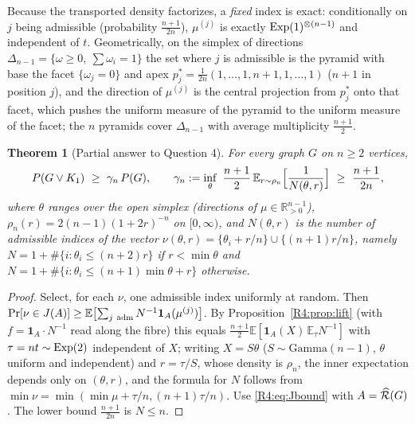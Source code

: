 \documentclass[11pt]{amsart}
\newtheorem{theorem}{Theorem}[section]
\theoremstyle{definition}
\theoremstyle{remark}
\providecommand{\R}{\mathbb R}
\begin{document}
Because the transported density factorizes, a \emph{fixed} index is
exact: conditionally on $j$ being admissible (probability
$\frac{n+1}{2n}$), $\mu^{(j)}$ is exactly $\operatorname{Exp}(1)^{\otimes(n-1)}$ and
independent of $t$.  Geometrically, on the simplex of directions
$\Delta_{n-1}=\{\omega\ge0,\ \sum\omega_i=1\}$ the set where $j$ is admissible
is the pyramid with base the facet $\{\omega_j=0\}$ and apex
$p_j^*=\frac1{2n}(1,\dots,1,n+1,1,\dots,1)$ ($n+1$ in position $j$), and the
direction of $\mu^{(j)}$ is the central projection from $p_j^*$ onto that
facet, which pushes the uniform measure of the pyramid to the uniform
measure of the facet; the $n$ pyramids cover $\Delta_{n-1}$ with average
multiplicity $\frac{n+1}2$.

\begin{theorem}[Partial answer to Question 4]\label{R4:thm:Q4partial}
For every graph $G$ on $n\ge2$ vertices,
\[
 P(G\vee K_1)\ \ge\ \gamma_n\,P(G),\qquad
 \gamma_n:=\inf_{\theta}\ \frac{n+1}{2}\,
 \mathbb E_{r\sim\rho_n}\Bigl[\frac1{N(\theta,r)}\Bigr]\ \ge\ \frac{n+1}{2n},
\]
where $\theta$ ranges over the open simplex (directions of
$\mu\in\R^{n-1}_{>0}$), $\rho_n(r)=2(n-1)(1+2r)^{-n}$ on $[0,\infty)$, and
$N(\theta,r)$ is the number of admissible indices of the vector
$\nu(\theta,r)=\{\theta_i+r/n\}\cup\{(n+1)r/n\}$, namely
$N=1+\#\{i:\theta_i\le(n+2)r\}$ if $r<\min\theta$ and
$N=1+\#\{i:\theta_i\le(n+1)\min\theta+r\}$ otherwise.
\end{theorem}

\begin{proof}
Select, for each $\nu$, one admissible index uniformly at random.  Then
$\Pr[\nu\in J(A)]\ge\mathbb E\bigl[\sum_{j\ \rm adm}N^{-1}\mathbf
1_A(\mu^{(j)})\bigr]$.  By Proposition~\ref{R4:prop:lift} (with
$f=\mathbf 1_A\cdot N^{-1}$ read along the fibre) this equals
$\frac{n+1}{2}\mathbb E[\mathbf 1_A(X)\,\mathbb E_\tau N^{-1}]$ with
$\tau=nt\sim\operatorname{Exp}(2)$ independent of $X$; writing $X=S\theta$
($S\sim\mathrm{Gamma}(n-1)$, $\theta$ uniform and independent) and
$r=\tau/S$, whose density is $\rho_n$, the inner expectation depends only
on $(\theta,r)$, and the formula for $N$ follows from
$\min\nu=\min(\min\mu+\tau/n,(n+1)\tau/n)$.  Use \eqref{R4:eq:Jbound} with
$A=\widehat{\mathcal{R}}(G)$.  The lower bound $\frac{n+1}{2n}$ is $N\le n$.
\end{proof}
\end{document}
